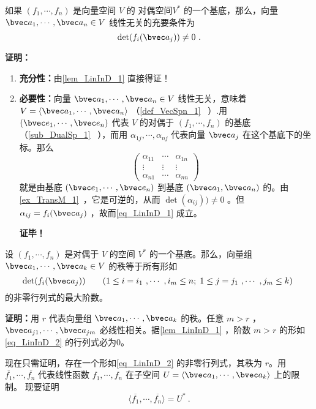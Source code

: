 \begin{lemma}{}\label{lem_LinInD_2}
如果 $(f_1,\cdots,f_n)$ 是向量空间 $V$ 的 对偶空间$V^*$ 的一个基底，那么，向量 $\bvec a_1,\cdots,\bvec a_n\in V$ 线性无关的充要条件为
\begin{equation}\label{eq_LinInD_1}
\det(f_i(\bvec a_j))\neq 0~.
\end{equation}
\end{lemma}
\textbf{证明：} \begin{enumerate}
\item \textbf{充分性：}由\autoref{lem_LinInD_1} 直接得证！
\item \textbf{必要性：}向量 $\bvec a_1,\cdots,\bvec a_n\in V$ 线性无关，意味着 $V=\langle\bvec a_1,\cdots,\bvec a_n\rangle$ （\autoref{def_VecSpn_1}~ ）.用 $(\bvec e_1,\cdots,\bvec e_n)$ 代表 $V$ 的对偶于 $(f_1,\cdots,f_n)$ 的基底（\autoref{sub_DualSp_1}~ ），而用 $\alpha_{1j},\cdots,\alpha_{nj}$ 代表向量 $\bvec a_j$ 在这个基底下的坐标。那么
\begin{equation}
\begin{pmatrix}
\alpha_{11}&\cdots&\alpha_{1n}\\
\vdots&\vdots&\vdots\\
\alpha_{n1}&\cdots&\alpha_{nn}
\end{pmatrix}~
\end{equation}
就是由基底 $(\bvec e_1,\cdots,\bvec e_n)$ 到基底 $(\bvec a_1,\bvec a_n)$ 的。由\autoref{ex_TransM_1}~，它是可逆的，从而 $\det(\alpha_{ij}))\neq0$ 。但 $\alpha_{ij}=f_i(\bvec a_j)$ ，故而\autoref{eq_LinInD_1} 成立。

\textbf{证毕！} 
\end{enumerate}
\begin{theorem}{}
设 $(f_1,\cdots,f_n)$ 是对偶于 $V$ 的空间 $V^*$ 的一个基底。那么，向量组 $\bvec a_1,\cdots,\bvec a_k\in V$ 的秩等于所有形如
\begin{equation}\label{eq_LinInD_2}
\det(f_i(\bvec a_j))\qquad (1\leq i=i_1~,\cdots~ ,i_m\leq n;\;1\leq j=j_1~,\cdots~,j_m\leq k)~
\end{equation}
的非零行列式的最大阶数。
\end{theorem}
\textbf{证明：}用 $r$ 代表向量组 $\bvec a_1,\cdots,\bvec a_k$ 的秩。任意 $m>r$ ，$\bvec a_{j1},\cdots,\bvec a_{jm}$ 必线性相关。据\autoref{lem_LinInD_1} ，阶数 $m>r$ 的形如\autoref{eq_LinInD_2} 的行列式必为0。

现在只需证明，存在一个形如\autoref{eq_LinInD_2} 的非零行列式，其秩为 $r$。用 $\overline{f_1},\cdots,\overline{f_n}$ 代表线性函数 $f_1,\cdots,f_n$ 在子空间 $U=\langle\bvec a_1,\cdots,\bvec a_k\rangle$ 上的限制。
现要证明
\begin{equation}\label{eq_LinInD_3}
\langle\overline{f_1},\cdots,\overline{f_n}\rangle=U^*~.
\end{equation}

